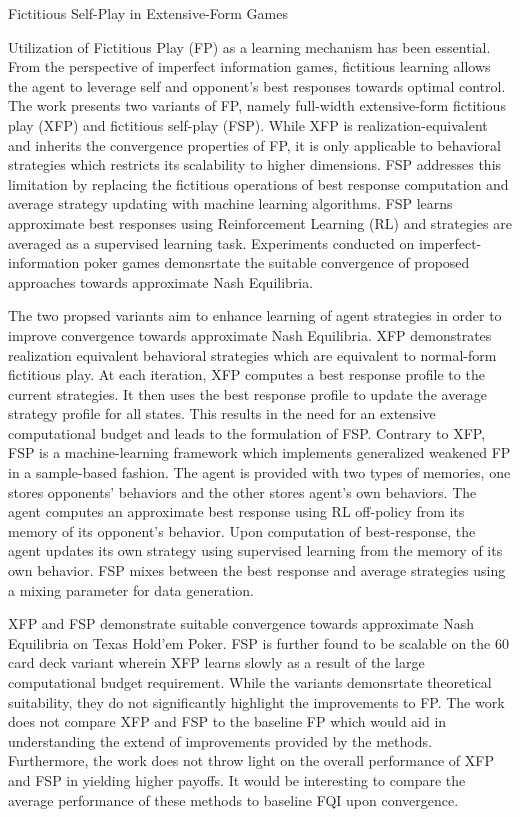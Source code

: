 \documentclass[11pt,letterpaper]{article}
\begin{document}
\begin{center}
  \large{Fictitious Self-Play in Extensive-Form Games}
\end{center}
Utilization of Fictitious Play (FP) as a learning mechanism has been essential. From the perspective of imperfect information games, fictitious learning allows the agent to leverage self and opponent's best responses towards optimal control. The work presents two variants of FP, namely full-width extensive-form fictitious play (XFP) and fictitious self-play (FSP). While XFP is realization-equivalent and inherits the convergence properties of FP, it is only applicable to behavioral strategies which restricts its scalability to higher dimensions. FSP addresses this limitation by replacing the fictitious operations of best response computation and average strategy updating with machine learning algorithms. FSP learns approximate best responses using Reinforcement Learning (RL) and strategies are averaged as a supervised learning task. Experiments conducted on imperfect-information poker games demonsrtate the suitable convergence of proposed approaches towards approximate Nash Equilibria. 

The two propsed variants aim to enhance learning of agent strategies in order to improve convergence towards approximate Nash Equilibria. XFP demonstrates realization equivalent behavioral strategies which are equivalent to normal-form fictitious play. At each iteration, XFP computes a best response profile to the current strategies. It then uses the best response profile to update the average strategy profile for all states. This results in the need for an extensive computational budget and leads to the formulation of FSP. Contrary to XFP, FSP is a machine-learning framework which implements generalized weakened FP in a sample-based fashion. The agent is provided with two types of memories, one stores opponents' behaviors and the other stores agent's own behaviors. The agent computes an approximate best response using RL off-policy from its memory of its opponent's behavior. Upon computation of best-response, the agent updates its own strategy using supervised learning from the memory of its own behavior. FSP mixes between the best response and average strategies using a mixing parameter for data generation. 

XFP and FSP demonstrate suitable convergence towards approximate Nash Equilibria on Texas Hold'em Poker. FSP is further found to be scalable on the 60 card deck variant wherein XFP learns slowly as a result of the large computational budget requirement. While the variants demonsrtate theoretical suitability, they do not significantly highlight the improvements to FP. The work does not compare XFP and FSP to the baseline FP which would aid in understanding the extend of improvements provided by the methods. Furthermore, the work does not throw light on the overall performance of XFP and FSP in yielding higher payoffs. It would be interesting to compare the average performance of these methods to baseline FQI upon convergence.
\end{document}

